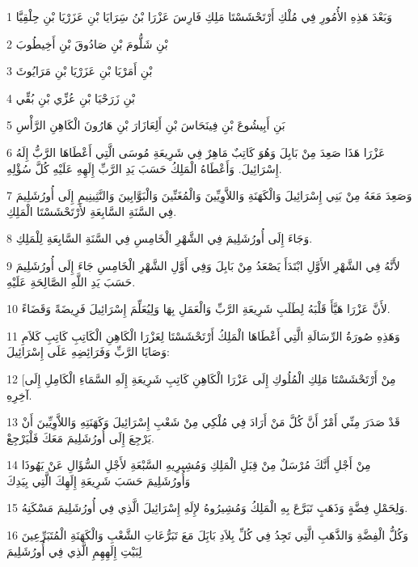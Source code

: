 \par 1 وَبَعْدَ هَذِهِ الأُمُورِ فِي مُلْكِ أَرْتَحْشَسْتَا مَلِكِ فَارِسَ عَزْرَا بْنُ سَِرَايَا بْنِ عَزَرْيَا بْنِ حِلْقِيَّا
\par 2 بْنِ شَلُّومَ بْنِ صَادُوقَ بْنِ أَخِيطُوبَ
\par 3 بْنِ أَمَرْيَا بْنِ عَزَرْيَا بْنِ مَرَايُوثَ
\par 4 بْنِ زَرَحْيَا بْنِ عُزِّي بْنِ بُقِّي
\par 5 بَنِ أَبِيشُوعَ بْنِ فِينَحَاسَ بْنِ أَلِعَازَارَ بْنِ هَارُونَ الْكَاهِنِ الرَّأْسِ
\par 6 عَزْرَا هَذَا صَعِدَ مِنْ بَابِلَ وَهُوَ كَاتِبٌ مَاهِرٌ فِي شَرِيعَةِ مُوسَى الَّتِي أَعْطَاهَا الرَّبُّ إِلَهُ إِسْرَائِيلَ. وَأَعْطَاهُ الْمَلِكُ حَسَبَ يَدِ الرَّبِّ إِلَهِهِ عَلَيْهِ كُلَّ سُؤْلِهِ.
\par 7 وَصَعِدَ مَعَهُ مِنْ بَنِي إِسْرَائِيلَ وَالْكَهَنَةِ وَاللاَّوِيِّينَ وَالْمُغَنِّينَ وَالْبَوَّابِينَ وَالنَّثِينِيمِ إِلَى أُورُشَلِيمَ فِي السَّنَةِ السَّابِعَةِ لأَرْتَحْشَسْتَا الْمَلِكِ.
\par 8 وَجَاءَ إِلَى أُورُشَلِيمَ فِي الشَّهْرِ الْخَامِسِ فِي السَّنَةِ السَّابِعَةِ لِلْمَلِكِ.
\par 9 لأَنَّهُ فِي الشَّهْرِ الأَوَّلِ ابْتَدَأَ يَصْعَدُ مِنْ بَابِلَ وَفِي أَوَّلِ الشَّهْرِ الْخَامِسِ جَاءَ إِلَى أُورُشَلِيمَ حَسَبَ يَدِ اللَّهِ الصَّالِحَةِ عَلَيْهِ.
\par 10 لأَنَّ عَزْرَا هَيَّأَ قَلْبَهُ لِطَلَبِ شَرِيعَةِ الرَّبِّ وَالْعَمَلِ بِهَا وَلِيُعَلِّمَ إِسْرَائِيلَ فَرِيضَةً وَقَضَاءً.
\par 11 وَهَذِهِ صُورَةُ الرِّسَالَةِ الَّتِي أَعْطَاهَا الْمَلِكُ أَرْتَحْشَسْتَا لِعَزْرَا الْكَاهِنِ الْكَاتِبِ كَاتِبِ كَلاَمِ وَصَايَا الرَّبِّ وَفَرَائِضِهِ عَلَى إِسْرَائِيلَ:
\par 12 [مِنْ أَرْتَحْشَسْتَا مَلِكِ الْمُلُوكِ إِلَى عَزْرَا الْكَاهِنِ كَاتِبِ شَرِيعَةِ إِلَهِ السَّمَاءِ الْكَامِلِ إِلَى آخِرِهِ.
\par 13 قَدْ صَدَرَ مِنِّي أَمْرٌ أَنَّ كُلَّ مَنْ أَرَادَ فِي مُلْكِي مِنْ شَعْبِ إِسْرَائِيلَ وَكَهَنَتِهِ وَاللاَّوِيِّينَ أَنْ يَرْجِعَ إِلَى أُورُشَلِيمَ مَعَكَ فَلْيَرْجِعْ.
\par 14 مِنْ أَجْلِ أَنَّكَ مُرْسَلٌ مِنْ قِبَلِ الْمَلِكِ وَمُشِيرِيهِ السَّبْعَةِ لأَجْلِ السُّؤَالِ عَنْ يَهُوذَا وَأُورُشَلِيمَ حَسَبَ شَرِيعَةِ إِلَهِكَ الَّتِي بِيَدِكَ
\par 15 وَلِحَمْلِ فِضَّةٍ وَذَهَبٍ تَبَرَّعَ بِهِ الْمَلِكُ وَمُشِيرُوهُ لإِلَهِ إِسْرَائِيلَ الَّذِي فِي أُورُشَلِيمَ مَسْكَنِهُ.
\par 16 وَكُلُّ الْفِضَّةِ وَالذَّهَبِ الَّتِي تَجِدُ فِي كُلِّ بِلاَدِ بَابَِلَ مَعَ تَبَرُّعَاتِ الشَّعْبِ وَالْكَهَنَةِ الْمُتَبَرِّعِينَ لِبَيْتِ إِلَهِهِمِ الَّذِي فِي أُورُشَلِيمَ
